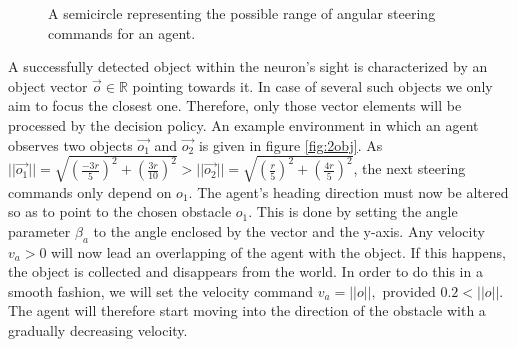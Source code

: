 \documentclass[10pt,a4paper,DIV=11]{scrreprt}
\begin{document}
\begin{center}
\begin{figure}[H]

	\caption{A semicircle representing the possible range of angular steering commands for an agent.}
	\label{fig:acontrol}
\end{figure}
\end{center}

A successfully detected object within the neuron's sight is characterized by an object vector $\overrightarrow{o} \in \mathbb{R}$ pointing towards it. 
In case of several such objects we only aim to focus the closest one. Therefore, only those vector elements will be processed by the decision policy.
An example environment in which an agent observes two objects $\overrightarrow{o_1}$ and $\overrightarrow{o_2}$ is given in figure \ref{fig:2obj}. As
$||\overrightarrow{o_1}|| = \sqrt{(\frac{-3r}{5})^2 + (\frac{3r}{10})^2} > ||\overrightarrow{o_2}|| = \sqrt{(\frac{r}{5})^2 + (\frac{4r}{5})^2}$, the next steering commands only 
depend on $o_1$. The agent's heading direction must now be altered so as to point to the chosen obstacle $o_1$. This is done by setting the angle
parameter $\beta_a$ to the angle enclosed by the vector and the y-axis. Any velocity $v_a > 0$ will now lead an overlapping of the agent with the
object. If this happens, the object is collected and disappears from the world. In order to do this in a smooth fashion, we will set the velocity
command $v_a = ||o||, \text{ provided } 0.2 < ||o||$. The agent will therefore start moving into the direction of the obstacle with a gradually decreasing velocity.
\end{document}
